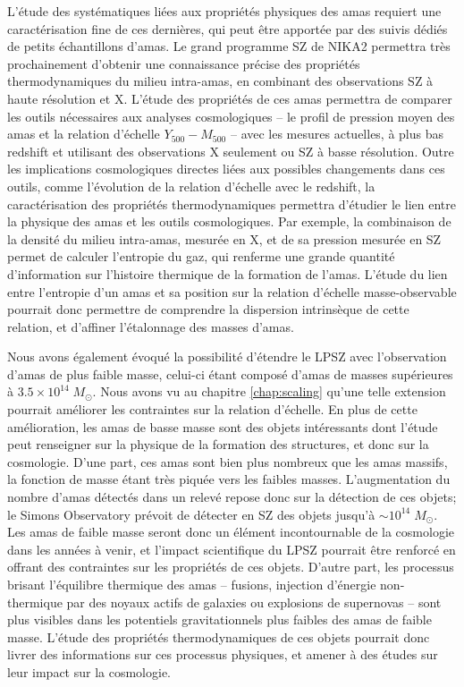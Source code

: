 L'étude des systématiques liées aux propriétés physiques des amas requiert une caractérisation fine de ces dernières, qui peut être apportée par des suivis dédiés de petits échantillons d'amas.
Le grand programme SZ de NIKA2 permettra très prochainement d'obtenir une connaissance précise des propriétés thermodynamiques du milieu intra-amas, en combinant des observations SZ à haute résolution et X.
L'étude des propriétés de ces amas permettra de comparer les outils nécessaires aux analyses cosmologiques -- le profil de pression moyen des amas et la relation d'échelle $Y_{500}-M_{500}$ -- avec les mesures actuelles, à plus bas redshift et utilisant des observations X seulement ou SZ à basse résolution.
Outre les implications cosmologiques directes liées aux possibles changements dans ces outils, comme l'évolution de la relation d'échelle avec le redshift, la caractérisation des propriétés thermodynamiques permettra d'étudier le lien entre la physique des amas et les outils cosmologiques.
Par exemple, la combinaison de la densité du milieu intra-amas, mesurée en X, et de sa pression mesurée en SZ permet de calculer l'entropie du gaz, qui renferme une grande quantité d'information sur l'histoire thermique de la formation de l'amas.
L'étude du lien entre l'entropie d'un amas et sa position sur la relation d'échelle masse-observable pourrait donc permettre de comprendre la dispersion intrinsèque de cette relation, et d'affiner l'étalonnage des masses d'amas.

Nous avons également évoqué la possibilité d'étendre le LPSZ avec l'observation d'amas de plus faible masse, celui-ci étant composé d'amas de masses supérieures à $3.5 \times 10^{14} \; M_\odot$.
Nous avons vu au chapitre \ref{chap:scaling} qu'une telle extension pourrait améliorer les contraintes sur la relation d'échelle.
En plus de cette amélioration, les amas de basse masse sont des objets intéressants dont l'étude peut renseigner sur la physique de la formation des structures, et donc sur la cosmologie.
D'une part, ces amas sont bien plus nombreux que les amas massifs, la fonction de masse étant très piquée vers les faibles masses.
L'augmentation du nombre d'amas détectés dans un relevé repose donc sur la détection de ces objets; le Simons Observatory prévoit de détecter en SZ des objets jusqu'à $\sim 10^{14} \; M_\odot$.
Les amas de faible masse seront donc un élément incontournable de la cosmologie dans les années à venir, et l'impact scientifique du LPSZ pourrait être renforcé en offrant des contraintes sur les propriétés de ces objets.
D'autre part, les processus brisant l'équilibre thermique des amas -- fusions, injection d'énergie non-thermique par des noyaux actifs de galaxies ou explosions de supernovas -- sont plus visibles dans les potentiels gravitationnels plus faibles des amas de faible masse.
L'étude des propriétés thermodynamiques de ces objets pourrait donc livrer des informations sur ces processus physiques, et amener à des études sur leur impact sur la cosmologie.

